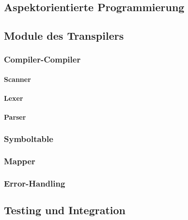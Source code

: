 
\subsection{Aspektorientierte Programmierung}
 
\subsection{Module des Transpilers}
\subsubsection{Compiler-Compiler}
\paragraph{Scanner}
\paragraph{Lexer}
\paragraph{Parser}
\subsubsection{Symboltable}

\subsubsection{Mapper}

\subsubsection{Error-Handling}

\subsection{Testing und Integration}

